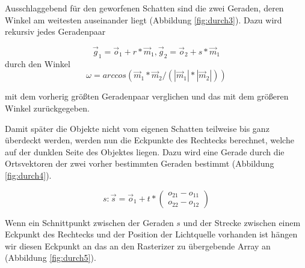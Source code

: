 

Ausschlaggebend für den geworfenen Schatten sind die zwei Geraden, deren Winkel am weitesten auseinander liegt (Abbildung \ref{fig:durch3}). Dazu wird rekursiv jedes Geradenpaar

\begin{equation}
	\vec{g}_1 = \vec{o}_1 + r * \vec{m}_1, \vec{g}_2 = \vec{o}_2 + s * \vec{m}_1
\end{equation}
durch den Winkel
\begin{equation}
	\omega = arccos(\vec{m}_1 * \vec{m}_2 / (|\vec{m}_1| * |\vec{m}_2|))
\end{equation}

mit dem vorherig größten Geradenpaar verglichen und das mit dem größeren Winkel zurückgegeben.


Damit später die Objekte nicht vom eigenen Schatten teilweise bis ganz überdeckt werden, werden nun die Eckpunkte des Rechtecks berechnet, welche auf der dunklen Seite des Objektes liegen. Dazu wird eine Gerade durch die Ortsvektoren der zwei vorher bestimmten Geraden bestimmt (Abbildung \ref{fig:durch4}).

\begin{equation}
	s: \vec{s} = \vec{o}_1 + t * \left(\begin{array}{c} o_21 - o_11 \\ o_22 - o_12 \end{array}\right)
\end{equation}


Wenn ein Schnittpunkt zwischen der Geraden $s$ und der Strecke zwischen einem Eckpunkt des Rechtecks und der Position der Lichtquelle vorhanden ist hängen wir diesen Eckpunkt an das an den Rasterizer zu übergebende Array an (Abbildung \ref{fig:durch5}).
